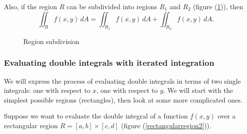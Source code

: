   Also, if the region $R$ can be subdivided into regions $R_1$ and $R_2$ (figure (\ref{regionsubdivision})), then
    \[
      \iint_R f(x, y) \, dA = \iint_{R_1} f(x, y) \, dA + \iint_{R_2} f(x, y) \, dA.
    \]

  \begin{figure}[H]
    \centering
    \def\svgwidth{0.4\columnwidth}
    
    \caption{Region subdivision}
    \label{regionsubdivision}
  \end{figure}

  \subsubsection*{Evaluating double integrals with iterated integration}
	

  We will express the process of evaluating double integrals in terms of two single integrals: one with respect to $x$, one with respect to $y$.  We will start with the simplest possible regions (rectangles), then look at some more complicated ones.

  Suppose we want to evaluate the double integral of a function $f(x, y)$ over a rectangular region $R = [a, b] \times [c, d]$ (figure (\ref{rectangularregion2})).  
	
